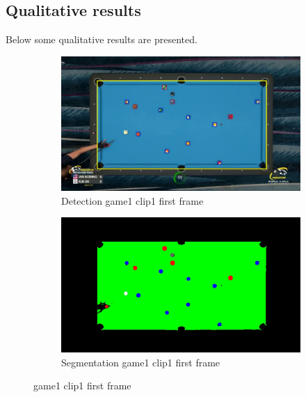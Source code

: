 \subsection{Qualitative results}
Below some qualitative results are presented.
\begin{figure}[H]
    \centering
    \begin{subfigure}[b]{0.4\textwidth}
        \centering
        \includegraphics[width=\textwidth]{images/Detection/game1_clip1_detected_balls_first_frame.jpg}
        \caption{Detection game1 clip1 first frame}
        \label{fig: game1_clip1_first_frame_detected}
    \end{subfigure}
    \begin{subfigure}[b]{0.4\textwidth}
        \centering
        \includegraphics[width=\textwidth]{images/Segmentation/game1_clip1_segmented_balls_first_frame.jpg}
        \caption{Segmentation game1 clip1 first frame}
		\label{fig: game1_clip1_first_frame_segmented}
    \end{subfigure}
	\caption{game1 clip1 first frame}
\end{figure}



